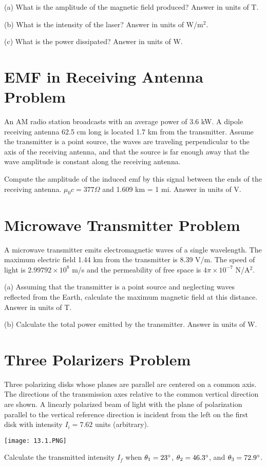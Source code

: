 \documentclass[../physics12.tex]{subfiles}
\begin{document}
(a) What is the amplitude of the magnetic field produced? Answer in units of T.

(b) What is the intensity of the laser? Answer in units of W/m$^2$.

(c) What is the power dissipated? Answer in units of W.

\section{EMF in Receiving Antenna Problem}
An AM radio station broadcasts with an average power of 3.6 kW. A dipole receiving antenna 62.5 cm long is located 1.7 km from the transmitter. 
Assume the transmitter is a point source, the waves are traveling perpendicular to the axis of the receiving antenna, and that the source is far enough away that the wave 
amplitude is constant along the receiving antenna.

Compute the amplitude of the induced emf by this signal between the ends of the receiving antenna. $\mu_0 c = 377 \Omega$ and 1.609 km = 1 mi. Answer in units of V.

\section{Microwave Transmitter Problem}
A microwave transmitter emits electromagnetic waves of a single wavelength. The maximum electric field 1.44 km from the transmitter is 8.39 V/m. The speed of light 
is $2.99792\times 10^8$ m/s and the permeability of free space is $4\pi \times 10^{-7}$ N/A$^2$. 

(a) Assuming that the transmitter is a point source and neglecting waves reflected from the Earth, calculate the maximum magnetic field at this distance. Answer in units of T.

(b) Calculate the total power emitted by the transmitter. Answer in units of W.

\section{Three Polarizers Problem}
Three polarizing disks whose planes are parallel are centered on a common axis. The directions of the transmission axes relative to the common vertical direction are shown.
A linearly polarized beam of light with the plane of polarization parallel to the vertical reference direction is incident from the left on the first disk with intensity $I_i = 7.62$ units (arbitrary).
\begin{center}
    \texttt{[image: 13.1.PNG]}
\end{center}
Calculate the transmitted intensity $I_f$ when $\theta_1 = 23\degree$, $\theta_2 = 46.3\degree$, and $\theta_3 = 72.9\degree$.
\end{document}
